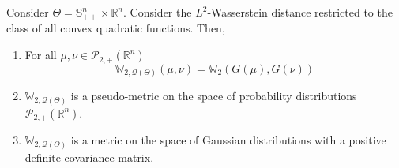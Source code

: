 \documentclass[10pt]{article}
\newcommand{\real}{\mathbb{R}}
\newcommand{\W}{\mathds{W}}
\newcommand{\Q}{\mathcal{Q}}
\numberwithin{equation}{section}
\begin{document}
\begin{proposition}\label{prop:Quad-metric}
	Consider $\Theta = \mathbb{S}^n_{++}\times \real^n$. 
	Consider the $L^2$-Wasserstein distance restricted to the class of all convex quadratic functions. Then,
	\begin{enumerate}
		\item For all $\mu,\nu \in \mathcal{P}_{2,+}(\real^n)$ 
		\begin{equation}\label{eq:W2-quad-identity}
		\W_{2,\Q(\Theta)}(\mu,\nu) = \W_{2}(G(\mu),G(\nu))
		\end{equation}
		\item $\W_{2,\Q(\Theta)}$ is a pseudo-metric on the space of probability distributions~$\mathcal{P}_{2,+}(\real^n)$. 
		\item $\W_{2,\Q(\Theta)}$ is a metric on the space of Gaussian distributions with a positive definite covariance matrix.
	\end{enumerate}
\end{proposition}
\end{document}
